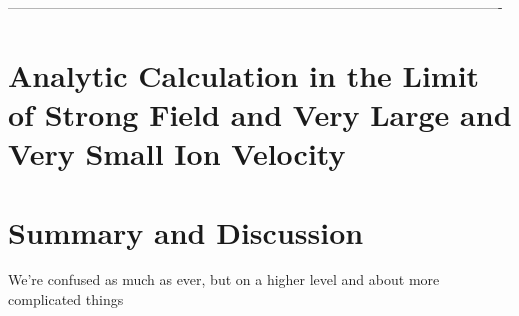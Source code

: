 \documentclass[12pt, reqno]{amsart}
\begin{document}
---------------------------------------------------------------------------------------------------------- 

 
\section{Analytic Calculation in the Limit of Strong Field and Very Large and Very Small Ion Velocity}



\section{Summary and Discussion}

We're confused as much as ever, but on a higher level and about more complicated things 
\end{document}
